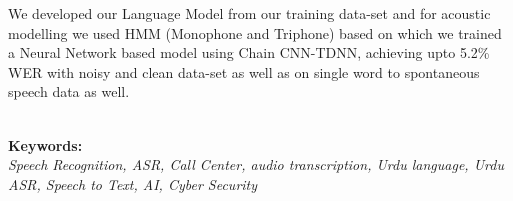 We developed our Language Model from our training data-set and for acoustic modelling we used HMM (Monophone and Triphone) based on which we trained a Neural Network based model using Chain CNN-TDNN, achieving upto 5.2\% WER with noisy and clean data-set as well as on single word to spontaneous speech data as well.

    \textbf{\\ Keywords:} \textit{\\ Speech Recognition, ASR, Call Center, audio transcription, Urdu language, Urdu ASR, Speech to Text, AI, Cyber Security}